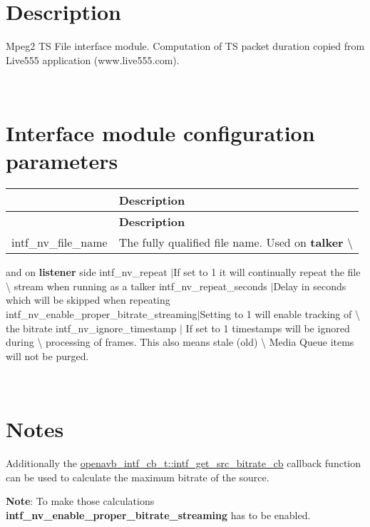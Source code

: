 \section*{Description}

Mpeg2 TS File interface module. Computation of TS packet duration copied from Live555 application (www.\+live555.\+com).

~\newline
 \section*{Interface module configuration parameters}

\tabulinesep=1mm
\begin{longtabu} spread 0pt [c]{*2{|X[-1]}|}
\hline
{}&{\bf Description  }\\
\endfirsthead
\hline
\endfoot
\hline
{}&{\bf Description  }\\
\endhead
intf\+\_\+nv\+\_\+file\+\_\+name &The fully qualified file name. Used on {\bfseries talker} \textbackslash{} \\
\end{longtabu}
and on {\bfseries listener} side intf\+\_\+nv\+\_\+repeat $\vert$\+If set to 1 it will continually repeat the file \textbackslash{} stream when running as a talker intf\+\_\+nv\+\_\+repeat\+\_\+seconds $\vert$\+Delay in seconds which will be skipped when repeating intf\+\_\+nv\+\_\+enable\+\_\+proper\+\_\+bitrate\+\_\+streaming$\vert$\+Setting to 1 will enable tracking of \textbackslash{} the bitrate intf\+\_\+nv\+\_\+ignore\+\_\+timestamp $\vert$ If set to 1 timestamps will be ignored during \textbackslash{} processing of frames. This also means stale (old) \textbackslash{} Media Queue items will not be purged.

~\newline
 \section*{Notes}

Additionally the \hyperlink{structopenavb__intf__cb__t_a43b6a9d9343f06ff21f680a90c9529f6}{openavb\+\_\+intf\+\_\+cb\+\_\+t\+::intf\+\_\+get\+\_\+src\+\_\+bitrate\+\_\+cb} callback function can be used to calculate the maximum bitrate of the source.

{\bfseries Note}\+: To make those calculations {\bfseries intf\+\_\+nv\+\_\+enable\+\_\+proper\+\_\+bitrate\+\_\+streaming} has to be enabled.

